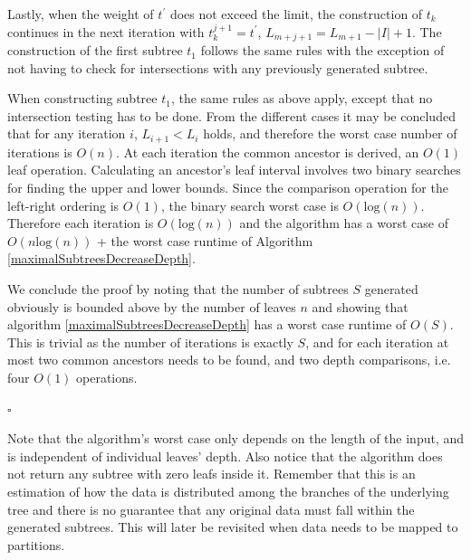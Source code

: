 \documentclass{report}
\begin{document}
Lastly, when the weight of $t^\prime$ does not exceed the limit, 
the construction of $t_k$ continues in the next iteration with $t_k^{j+1} = t^\prime$, $L_{m+j+1} = L_{m+1} - |I| + 1$.
The construction of the first subtree $t_1$ follows the same rules with the exception of not having to check for intersections with any previously generated subtree.

When constructing subtree $t_1$, the same rules as above apply, except that no intersection testing has to be done. From the different cases it may be concluded that for any iteration 
$i$, $L_{i+1} < L_{i}$ holds, and therefore the worst case number of iterations is $O(n)$. At each iteration the common ancestor is derived, an $O(1)$ leaf operation.
Calculating an ancestor's leaf interval involves two binary searches for finding the upper and lower bounds. Since the comparison operation for the left-right ordering is $O(1)$,
the binary search worst case is $O(\text{log}(n))$. Therefore each iteration is $O(\text{log}(n))$ and the algorithm has a worst case of $O(n\text{log}(n))$ + the worst case runtime of Algorithm \ref{maximalSubtreesDecreaseDepth}.

We conclude the proof by noting that the number of subtrees $S$ generated obviously is bounded above by the number of leaves $n$
and showing that algorithm \ref{maximalSubtreesDecreaseDepth} has a worst case runtime of $O(S)$. This is trivial as the number of iterations is exactly
$S$, and for each iteration at most two common ancestors needs to be found, and two depth comparisons, i.e. four $O(1)$ operations.

\hfill$\square$

\noindent \newline Note that the algorithm's worst case only depends on the length of the input, and is independent of individual leaves' depth. Also notice that the algorithm does not return any subtree with zero leafs inside it.
Remember that this is an estimation of how the data is distributed among the branches of the underlying tree and there is no guarantee that any original data must fall within the generated subtrees. 
This will later be revisited when data needs to be mapped to partitions.
\end{document}
